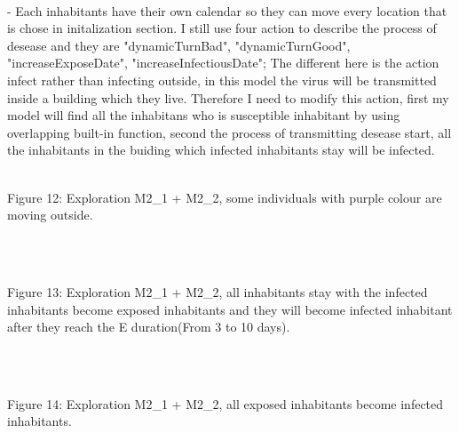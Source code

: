 \documentclass{article}
\begin{document}
\\- Each inhabitants have their own calendar so they can move every location that is chose in initalization section. I still use four action to describe the process of desease and they are "dynamicTurnBad", "dynamicTurnGood", "increaseExposeDate", "increaseInfectiousDate"; The different here is the action infect rather than infecting outside, in this model the virus will be transmitted inside a building which they live. Therefore I need to modify this action, first my model will find all the inhabitans who is susceptible inhabitant by using overlapping built-in function, second the process of transmitting desease start, all the inhabitants in the buiding which infected inhabitants stay will be infected.
\\
\begin{pic12}
\\
\caption{Figure 12: Exploration M2\_1 + M2\_2, some individuals with purple colour are moving outside.} 
\end{pic12}
\\
\begin{pic13}
\\
\caption{Figure 13: Exploration M2\_1 + M2\_2, all inhabitants stay with the infected inhabitants become exposed inhabitants and they will become infected inhabitant after they reach the E duration(From 3 to 10 days).} 
\end{pic13}
\\
\begin{pic14}
\\
\caption{Figure 14: Exploration M2\_1 + M2\_2, all exposed inhabitants become infected inhabitants.} 
\end{pic14}
\\
\end{document}

